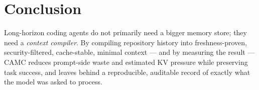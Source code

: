 \documentclass[11pt]{article}
\begin{document}
\section{Conclusion}

Long-horizon coding agents do not primarily need a bigger memory store; they need a
\emph{context compiler}. By compiling repository history into freshness-proven,
security-filtered, cache-stable, minimal context --- and by measuring the result ---
CAMC reduces prompt-side waste and estimated KV pressure while preserving task
success, and leaves behind a reproducible, auditable record of exactly what the
model was asked to process.
\end{document}
